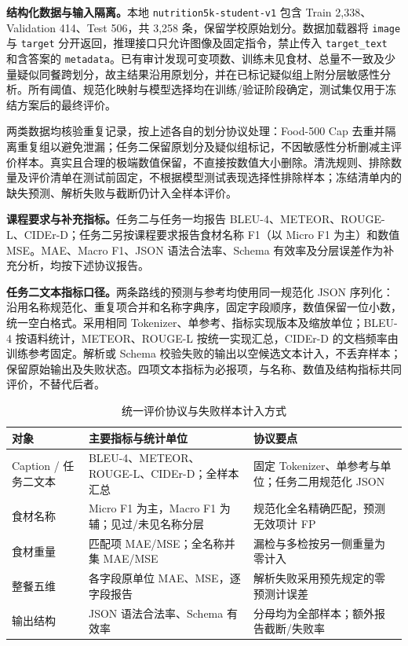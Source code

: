 \textbf{结构化数据与输入隔离。}本地 \texttt{nutrition5k-student-v1} 包含 Train 2,338、Validation 414、Test 506，共 3,258 条，保留学校原始划分。数据加载器将 \texttt{image} 与 \texttt{target} 分开返回，推理接口只允许图像及固定指令，禁止传入 \texttt{target\_text} 和含答案的 \texttt{metadata}。已有审计发现可变项数、训练未见食材、总量不一致及少量疑似同餐跨划分，故主结果沿用原划分，并在已标记疑似组上附分层敏感性分析。所有阈值、规范化映射与模型选择均在训练/验证阶段确定，测试集仅用于冻结方案后的最终评价。

两类数据均核验重复记录，按上述各自的划分协议处理：Food-500 Cap 去重并隔离重复组以避免泄漏；任务二保留原划分及疑似组标记，不因敏感性分析删减主评价样本。真实且合理的极端数值保留，不直接按数值大小删除。清洗规则、排除数量及评价清单在测试前固定，不根据模型测试表现选择性排除样本；冻结清单内的缺失预测、解析失败与截断仍计入全样本评价。

\textbf{课程要求与补充指标。}任务二与任务一均报告 BLEU-4、METEOR、ROUGE-L、CIDEr-D；任务二另按课程要求报告食材名称 F1（以 Micro F1 为主）和数值 MSE。MAE、Macro F1、JSON 语法合法率、Schema 有效率及分层误差作为补充分析，均按下述协议报告。

\textbf{任务二文本指标口径。}两条路线的预测与参考均使用同一规范化 JSON 序列化：沿用名称规范化、重复项合并和名称字典序，固定字段顺序，数值保留一位小数，统一空白格式。采用相同 Tokenizer、单参考、指标实现版本及缩放单位；BLEU-4 按语料统计，METEOR、ROUGE-L 按统一实现汇总，CIDEr-D 的文档频率由训练参考固定。解析或 Schema 校验失败的输出以空候选文本计入，不丢弃样本；保留原始输出及失败状态。四项文本指标为必报项，与名称、数值及结构指标共同评价，不替代后者。

\begin{table}[!htbp]
\caption{统一评价协议与失败样本计入方式}
\label{tab:fl-metrics}\centering\small
\setlength{\tabcolsep}{4pt}\renewcommand{\arraystretch}{1.15}
\begin{tabularx}{\linewidth}{@{}P{2.35cm}YP{4.0cm}@{}}\toprule
\textbf{对象} & \textbf{主要指标与统计单位} & \textbf{协议要点}\\\midrule
Caption / 任务二文本 & BLEU-4、METEOR、ROUGE-L、CIDEr-D；全样本汇总 & 固定 Tokenizer、单参考与单位；任务二用规范化 JSON\\
食材名称 & Micro F1 为主，Macro F1 为辅；见过/未见名称分层 & 规范化全名精确匹配，预测无效项计 FP\\
食材重量 & 匹配项 MAE/MSE；全名称并集 MAE/MSE & 漏检与多检按另一侧重量为零计入\\
整餐五维 & 各字段原单位 MAE、MSE，逐字段报告 & 解析失败采用预先规定的零预测计误差\\
输出结构 & JSON 语法合法率、Schema 有效率 & 分母均为全部样本；额外报告截断/失败率\\\bottomrule
\end{tabularx}
\end{table}

